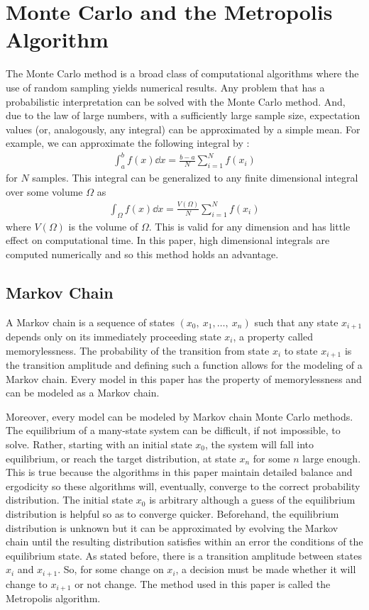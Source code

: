 \documentclass[11pt]{article}
\begin{document}
\section{Monte Carlo and the Metropolis Algorithm}
The Monte Carlo method is a broad class of computational algorithms where the use of random sampling yields numerical results. Any problem that has a probabilistic interpretation can be solved with the Monte Carlo method. And, due to the law of large numbers, with a sufficiently large sample size, expectation values (or, analogously, any integral) can be approximated by a simple mean. For example, we can approximate the following integral by \cite{MonteCarloLLN}:
\begin{align}
	\int_a^bf(x)\dd{x}=\frac{b-a}{N}\sum_{i=1}^Nf(x_i)
\end{align}
for $N$ samples. This integral can be generalized to any finite dimensional integral over some volume $\Omega$ as
\begin{align}
	\int_\Omega f(x)\dd{x}=\frac{V(\Omega)}{N}\sum_{i=1}^Nf(x_i)
	\label{eq:MCIntGen}
\end{align} where $V(\Omega)$ is the volume of $\Omega$. This is valid for any dimension and has little effect on computational time. In this paper, high dimensional integrals are computed numerically and so this method holds an advantage.

\subsection{Markov Chain}
A Markov chain is a sequence of states $(x_0,\ x_1,\ldots,\ x_n)$ such that any state $x_{i+1}$ depends only on its immediately proceeding state $x_i$, a property called memorylessness. The probability of the transition from state $x_i$ to state $x_{i+1}$ is the transition amplitude and defining such a function allows for the modeling of a Markov chain. Every model in this paper has the property of memorylessness and can be modeled as a Markov chain.

Moreover, every model can be modeled by Markov chain Monte Carlo methods. The equilibrium of a many-state system can be difficult, if not impossible, to solve. Rather, starting with an initial state $x_0$, the system will fall into equilibrium, or reach the target distribution, at state $x_n$ for some $n$ large enough. This is true because the algorithms in this paper maintain detailed balance and ergodicity so these algorithms will, eventually, converge to the correct probability distribution. The initial state $x_0$ is arbitrary although a guess of the equilibrium distribution is helpful so as to converge quicker. Beforehand, the equilibrium distribution is unknown but it can be approximated by evolving the Markov chain until the resulting distribution satisfies within an error the conditions of the equilibrium state. As stated before, there is a transition amplitude between states $x_i$ and $x_{i+1}$. So, for some change on $x_i$, a decision must be made whether it will change to $x_{i+1}$ or not change. The method used in this paper is called the Metropolis algorithm.
\end{document}
